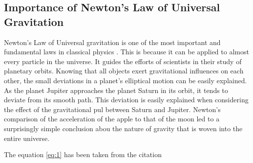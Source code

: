\documentclass[a4paper, 12pt]{article}
\begin{document}
\subsection*{Importance of Newton's Law of Universal Gravitation} 
Newton's Law of Universal gravitation is one of the most important and fundamental laws in classical physics . This is because it can be applied to almost every particle in the universe. It guides the 
efforts of scientists in their study of planetary orbits. Knowing that all objects exert gravitational influences on each other, the small 
deviations in a planet's elliptical motion can be easily explained. As the planet Jupiter approaches the planet Saturn in its orbit, it tends to 
deviate from its smooth path. This deviation is easily explained when considering the effect of the gravitational pul between Saturn and Jupiter.
Newton's comparison of the acceleration of the apple to that of the moon led to a surprisingly simple conclusion abou the nature of gravity that is woven into the entire universe. \par
    The equation \ref{eq:1} has been taken from the citation~\cite{Verlinde2011}

              
 
\end{document}
